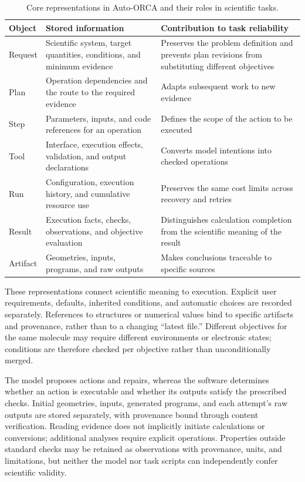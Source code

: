 \begin{table}[htbp]
  \centering\small
  \caption{Core representations in Auto-ORCA and their roles in scientific tasks.}
  \label{tab:domain-objects}
  \begin{tabularx}{\linewidth}{>{\raggedright\arraybackslash}p{1.65cm}YY}
    \toprule
    Object & Stored information & Contribution to task reliability\\
    \midrule
    Request & Scientific system, target quantities, conditions, and minimum evidence & Preserves the problem definition and prevents plan revisions from substituting different objectives\\
    Plan & Operation dependencies and the route to the required evidence & Adapts subsequent work to new evidence\\
    Step & Parameters, inputs, and code references for an operation & Defines the scope of the action to be executed\\
    Tool & Interface, execution effects, validation, and output declarations & Converts model intentions into checked operations\\
    Run & Configuration, execution history, and cumulative resource use & Preserves the same cost limits across recovery and retries\\
    Result & Execution facts, checks, observations, and objective evaluation & Distinguishes calculation completion from the scientific meaning of the result\\
    Artifact & Geometries, inputs, programs, and raw outputs & Makes conclusions traceable to specific sources\\
    \bottomrule
  \end{tabularx}
\end{table}

These representations connect scientific meaning to execution.
Explicit user requirements, defaults, inherited conditions, and automatic choices are recorded separately.
References to structures or numerical values bind to specific artifacts and provenance, rather than to a changing ``latest file.''
Different objectives for the same molecule may require different environments or electronic states; conditions are therefore checked per objective rather than unconditionally merged.

The model proposes actions and repairs, whereas the software determines whether an action is executable and whether its outputs satisfy the prescribed checks.
Initial geometries, inputs, generated programs, and each attempt's raw outputs are stored separately, with provenance bound through content verification.
Reading evidence does not implicitly initiate calculations or conversions; additional analyses require explicit operations.
Properties outside standard checks may be retained as observations with provenance, units, and limitations, but neither the model nor task scripts can independently confer scientific validity.

